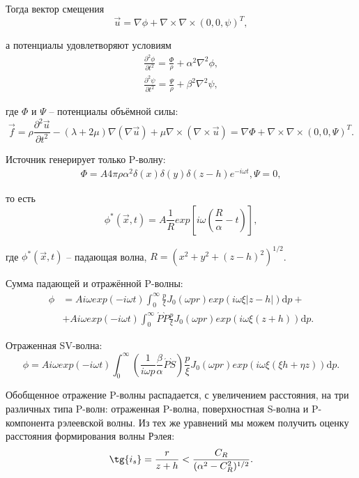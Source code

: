 Тогда вектор смещения
\begin{equation}
\vec{u} = \nabla \phi + \nabla \times \nabla \times (0, 0, \psi)^T,
\end{equation}

а потенциалы удовлетворяют условиям
\begin{align}
\frac{\partial^2 \phi}{\partial t^2} = \frac{\Phi}{\rho} + \alpha^2 \nabla^2 \phi, \nonumber\\
\frac{\partial^2 \psi}{\partial t^2} = \frac{\Psi}{\rho} + \beta^2 \nabla^2 \psi,
\end{align}

где $\Phi$ и $\Psi$ -- потенциалы объёмной силы:
\begin{equation}
\vec{f} = \rho \frac{\partial^2 \vec{u}}{\partial t^2} - (\lambda + 2\mu)\nabla(\nabla\vec{u}) + \mu \nabla \times (\nabla \times \vec{u} ) = \nabla \Phi + \nabla \times \nabla \times (0, 0, \Psi)^T.
\end{equation}

Источник генерирует только P-волну:
\begin{align}
\Phi = A 4\pi \rho \alpha^2 \delta(x)\delta(y)\delta(z-h)e^{-i \omega t},
\Psi = 0,
\end{align}

то есть
\begin{equation}
\phi^*(\vec{x}, t) = A \frac{1}{R} exp[i\omega (\frac{R}{\alpha} - t)],
\end{equation}

где $\phi^*(\vec{x}, t)$ -- падающая волна, $R = (x^2 + y^2 + (z-h)^2)^{1/2}$.

Сумма падающей и отражённой P-волны:
\begin{align}
\phi &= A i \omega exp(-i \omega t) \int_0^\infty { \frac{p}{\xi}J_0(\omega pr)exp(i \omega \xi |z - h|) \mathrm{d}p} + \nonumber\\
 & + A i \omega exp(-i \omega t) \int_0^\infty { \acute{P}\grave{P} \frac{p}{\xi}J_0(\omega pr)exp(i \omega \xi (z + h)) \mathrm{d}p}.
\end{align}

Отраженная SV-волна:
\begin{equation}
\phi = A i \omega exp(-i \omega t) \int_0^\infty { (\frac{1}{i \omega p} \frac{\beta}{\alpha} \acute{P}\grave{S}) \frac{p}{\xi}J_0(\omega pr)exp(i \omega \xi (\xi h + \eta z) ) \mathrm{d}p}.
\end{equation}

Обобщенное отражение P-волны распадается, с увеличением расстояния, на три различных типа P-волн: отраженная P-волна, поверхностная S-волна и P-компонента рэлеевской волны. Из тех же уравнений мы можем получить оценку расстояния формирования волны Рэлея:
\begin{equation}
\tg{i_s} = \frac{r}{z+h} < \frac{C_R}{(\alpha^2 - C_R^2)^{1/2}}.
\end{equation}

